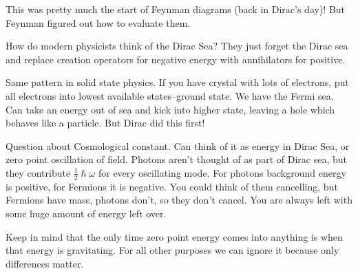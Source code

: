 \documentclass[]{article}
\begin{document}
This was pretty much the start of Feynman diagrams (back in Dirac's day)! But Feynman figured out how to evaluate them.

How do modern physicists think of the Dirac Sea? They just forget the Dirac sea and replace creation operators for negative energy with annihilators for positive.

Same pattern in solid state physics. If you have crystal with lots of electrons, put all electrons into lowest available states--ground state. We have the Fermi sea. Can take an energy out of sea and kick into higher state, leaving a hole which behaves like a particle. But Dirac did this first!

Question about Cosmological constant. Can think of it as energy in Dirac Sea, or zero point oscillation of field. Photons aren't thought of as part of Dirac sea, but they contribute $\frac{1}{2}\hslash\omega$ for every oscillating mode. For photons background energy is positive, for Fermions it is negative. You could think of them cancelling, but Fermions have mass, photons don't, so they don't cancel. You are always left with some huge amount of energy left over. 

Keep in mind that the only time zero point energy comes into anything is when that energy is gravitating. For all other purposes we can ignore it because only differences matter.


\raggedright

\end{document}
